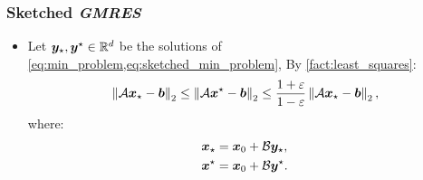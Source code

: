 \begin{frame}
    \frametitle{Sketched \textit{GMRES}}

    \begin{itemize}
        \item Let $\bm{y}_{\star}, \bm{y}^{\star} \in \mathbb{R}^{d}$ be the solutions of \cref{eq:min_problem,eq:sketched_min_problem}, By \cref{fact:least_squares}:
        \begin{align}
            \left\lVert \mathcal{A} \bm{x}_{\star} - \bm{b} \right\rVert_2 \leq \left\lVert \mathcal{A} \bm{x}^{\star} - \bm{b} \right\rVert_2 \leq \frac{1 + \varepsilon}{1 - \varepsilon} \left\lVert \mathcal{A} \bm{x}_{\star} - \bm{b} \right\rVert_2, \label{eq:sketched_gmres_estimate}
        \end{align}
        where:
        \begin{align}
            \bm{x}_{\star} &= \bm{x}_0 + \mathcal{B} \bm{y}_{\star}, \\
            \bm{x}^{\star} &= \bm{x}_0 + \mathcal{B} \bm{y}^{\star}.
        \end{align}
    \end{itemize}

\end{frame}